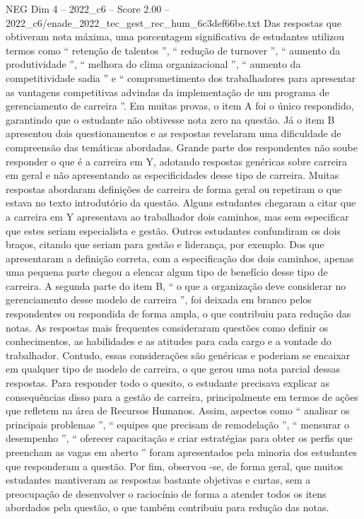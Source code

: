 \begin{textsample}{NEG Dim 4 – 2022\_c6 – Score 2.00 – 2022\_c6/enade\_2022\_tec\_gest\_rec\_hum\_6c3def66be.txt}
Das respostas que obtiveram nota máxima, uma porcentagem significativa de estudantes utilizou termos como “ retenção de talentos ”, “ redução de turnover ”, “ aumento da produtividade ”, “ melhora do clima organizacional ”, “ aumento da competitividade sadia ” e “ comprometimento dos trabalhadores para apresentar as vantagens competitivas advindas da implementação de um programa de gerenciamento de carreira ”.
Em muitas provas, o item A foi o único respondido, garantindo que o estudante não obtivesse nota zero na questão.
Já o item B apresentou dois questionamentos e as respostas revelaram uma dificuldade de compreensão das temáticas abordadas.
Grande parte dos respondentes não soube responder o que é a carreira em Y, adotando respostas genéricas sobre carreira em geral e não apresentando as especificidades desse tipo de carreira.
Muitas respostas abordaram definições de carreira de forma geral ou repetiram o que estava no texto introdutório da questão.
Alguns estudantes chegaram a citar que a carreira em Y apresentava ao trabalhador dois caminhos, mas sem especificar que estes seriam especialista e gestão.
Outros estudantes confundiram os dois braços, citando que seriam para gestão e liderança, por exemplo.
Dos que apresentaram a definição correta, com a especificação dos dois caminhos, apenas uma pequena parte chegou a elencar algum tipo de benefício desse tipo de carreira.
A segunda parte do item B, “ o que a organização deve considerar no gerenciamento desse modelo de carreira ”, foi deixada em branco pelos respondentes ou respondida de forma ampla, o que contribuiu para redução das notas.
As respostas mais frequentes consideraram questões como definir os conhecimentos, as habilidades e as atitudes para cada cargo e a vontade do trabalhador.
Contudo, essas considerações são genéricas e poderiam se encaixar em qualquer tipo de modelo de carreira, o que gerou uma nota parcial dessas respostas.
Para responder todo o quesito, o estudante precisava explicar as consequências disso para a gestão de carreira, principalmente em termos de ações que refletem na área de Recursos Humanos.
Assim, aspectos como “ analisar os principais problemas ”, “ equipes que precisam de remodelação ”, “ mensurar o desempenho ”, “ oferecer capacitação e criar estratégias para obter os perfis que preencham as vagas em aberto ” foram apresentados pela minoria dos estudantes que responderam a questão.
Por fim, observou -se, de forma geral, que muitos estudantes mantiveram as respostas bastante objetivas e curtas, sem a preocupação de desenvolver o raciocínio de forma a atender todos os itens abordados pela questão, o que também contribuiu para redução das notas.

\end{textsample}
